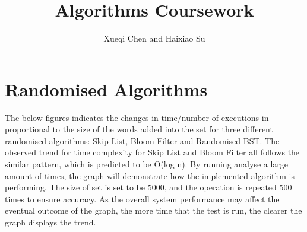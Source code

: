 \documentclass[11pt]{article}
\begin{document}
\title{Algorithms Coursework}
\author{Xueqi Chen and Haixiao Su}

\maketitle
\section*{Randomised Algorithms}
The below figures indicates the changes in time/number of executions in proportional to the size of the words added into the set for three different randomised algorithms: Skip List, Bloom Filter and Randomised BST. The observed trend for time complexity for Skip List and Bloom Filter all follows the similar pattern, which is predicted to be O(log n).
By running analyse a large amount of times, the graph will demonstrate how the implemented algorithm is performing. The size of set is set to be 5000, and the operation is repeated 500 times to ensure accuracy. As the overall system performance may affect the eventual outcome of the graph, the more time that the test is run, the clearer the graph displays the trend. 
\end{document}
